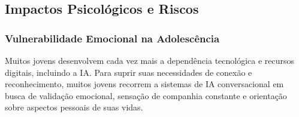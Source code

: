 \documentclass[12pt]{article}
\begin{document}


\subsection{Impactos Psicológicos e Riscos}


\subsubsection{Vulnerabilidade Emocional na Adolescência}

Muitos jovens desenvolvem cada vez mais a dependência tecnológica e recursos digitais, incluindo a IA. Para suprir suas necessidades de conexão e reconhecimento, muitos jovens recorrem a sistemas de IA conversacional em busca de validação emocional, sensação de companhia constante e orientação sobre aspectos pessoais de suas vidas. \cite{divmagic2025}
\end{document}
